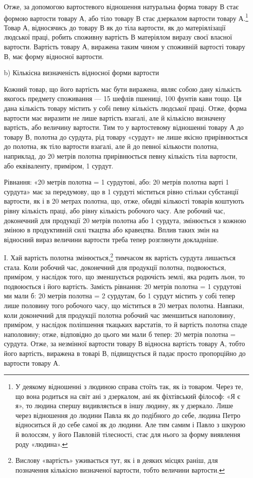 Отже, за допомогою вартостевого відношення натуральна форма
товару В стає формою вартости товару А, або тіло товару В
стає дзеркалом вартости товару А.\footnote{
У деякому відношенні з людиною справа стоїть так, як із товаром.
Через те, що вона родиться на світ ані з дзеркалом, ані як фіхтівський
філософ: «Я є я», то людина спершу видивляється в іншу людину, як у
дзеркало. Лише через відношення до людини Павла як до подібного до
себе, людина Петро відноситься й до себе самої як до людини. Але тим
самим і Павло з шкурою й волоссям, у його Павловій тілесності, стає для
нього за форму виявлення роду «людина».
} Товар А, відносячись до товару
В як до тіла вартости, як до матеріялізації людської праці, робить
споживну вартість В матеріялом виразу своєї власної вартости.
Вартість товару А, виражена таким чином у споживній
вартості товару В, має форму відносної вартости.

b) Кількісна визначеність відносної форми вартости

Кожний товар, що його вартість має бути виражена, являє собою
дану кількість якогось предмету споживання — 15 шефлів
пшениці, 100 фунтів кави тощо. Ця дана кількість товару містить
у собі певну кількість людської праці. Отже, форма вартости має
виразити не лише вартість взагалі, але й кількісно визначену
вартість, або величину вартости. Тим то у вартостевому відношенні
товару А до товару В, полотна до сурдута, рід товару «сурдут»
не лише якісно прирівнюється до полотна, як тіло вартости
взагалі, але й до певної кількости полотна, наприклад, до 20 метрів
полотна прирівнюється певну кількість тіла вартости, або
еквіваленту, приміром, 1 сурдут.

Рівнання: «20 метрів полотна = 1 сурдутові, або: 20 метрів
полотна варті 1 сурдута» має за передумову, що в 1 сурдуті міститься
рівно стільки субстанції вартости, як і в 20 метрах полотна,
що, отже, обидві кількості товарів коштують рівну кількість
праці, або рівну кількість робочого часу. Але робочий час,
доконечний для продукції 20 метрів полотна або 1 сурдута, змінюється
з кожною зміною в продуктивній силі ткацтва або кравецтва.
Вплив таких змін на відносний вираз величини вартости
треба тепер розглянути докладніше.

I. Хай вартість полотна змінюється,\footnote{
Вислову «вартість» уживається тут, як і в деяких місцях раніш,
для позначення кількісно визначеної вартости, тобто величини вартости.
} тимчасом як вартість
сурдута лишається стала. Коли робочий час, доконечний для продукції
полотна, подвоюється, приміром, у наслідок того, що зменшується
родючість землі, яка родить льон, то подвоюється і його
вартість. Замість рівнання: 20 метрів полотна = 1 сурдутові ми
мали б: 20 метрів полотна = 2 сурдутам, бо 1 сурдут містить у
собі тепер лише половину того робочого часу, що міститься в
20 метрах полотна. Навпаки, коли доконечний для продукції
полотна робочий час зменшиться наполовину, приміром, у наслідок
поліпшення ткацьких варстатів, то й вартість полотна спаде
наполовину; отже, відповідно до цього ми мали б тепер: 20 метрів
полотна =  сурдута. Отже, за незмінної вартости товару В
відносна вартість товару А, тобто його вартість, виражена в товарі
В, підвищується й падає просто пропорційно до вартости
товару А.

